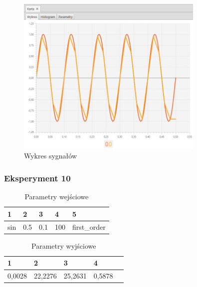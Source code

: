 \documentclass[12pt]{article}
\begin{document}
{{{                \begin{figure}[H]
                    \centering
                    \includegraphics[width=0.8\textwidth]{img/result/experiment1/09/data_draw_original_chart_recon_output_130256.png}
                    \caption{Wykres sygnałów}
                \end{figure}
            }
            \newpage

            \subsubsection{Eksperyment 10} {
                \begin{table}[H]
                    \centering
                    \begin{tabular}{|l|l|l|l|l|}
                        \hline
                        1 & 2 & 3 & 4 & 5   \\ \hline
                        sin & 0.5 & 0.1 & 100 & first\_order  \\ \hline
                    \end{tabular}
                    \caption{Parametry wejściowe}
                \end{table}

                \begin{table}[H]
                    \centering
                    \begin{tabular}{|l|l|l|l|l|}
                        \hline
                        1 & 2 & 3 & 4   \\ \hline
                        0,0028 & 22,2276 & 25,2631 & 0,5878  \\ \hline
                    \end{tabular}
                    \caption{Parametry wyjściowe}
                \end{table}


}}}
\end{document}
